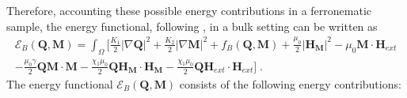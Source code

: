 \documentclass{article}
\def\Qvec{\mathbf{Q}}
\def \Mvec{\mathbf{M}}
\def\Hvec{\mathbf{H}}
\begin{document}
Therefore, accounting these possible energy contributions in a ferronematic sample, the energy functional, following \cite{dutta2026existence}, in a bulk setting can be written as
\begin{eqnarray}\label{bulk_energy}
\mathcal{E}_B\left(\Qvec, \Mvec\right) = \int_{\Omega}\biggl[ \frac{K_1}{2}|\nabla \Qvec|^2 + \frac{K_2}{2}|\nabla \Mvec|^2 + f_B\left(\Qvec, \Mvec\right) + \frac{\mu_0}{2}|\Hvec_{\Mvec}|^2 - \mu_0\Mvec\cdot \Hvec_{ext}\nonumber\\
- \frac{\mu_0\gamma}{2}\Qvec\Mvec\cdot\Mvec - \frac{\chi_1\mu_0}{2}\Qvec\Hvec_{\Mvec}\cdot\Hvec_{\Mvec} - \frac{\chi_1\mu_0}{2}\Qvec\Hvec_{ext}\cdot\Hvec_{ext}\biggr]\;.
\end{eqnarray}
The energy functional $\mathcal{E}_B\left(\Qvec, \Mvec\right)$ consists of the following energy contributions:
\end{document}
